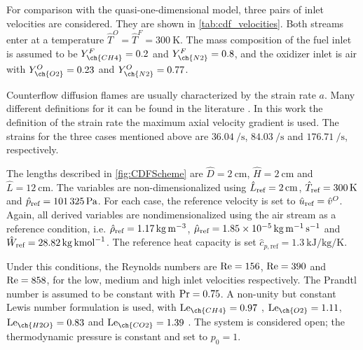 For comparison with the quasi-one-dimensional model, three pairs of inlet velocities are considered. They are shown in \cref{tab:cdf_velocities}. Both streams enter at a temperature $\hat T^O = \hat T^F = \SI{300}{\kelvin}$. The mass composition of the fuel inlet is assumed to be  $Y^F_{\ch{CH4}} = 0.2$ and $Y^F_{\ch{N2}} = 0.8$, and the oxidizer inlet is air with  $Y^O_{\ch{O2}} = 0.23$ and $Y^O_{\ch{N2}} = 0.77$. 


Counterflow diffusion flames are usually characterized by the strain rate $a$. Many different definitions for it can be found in the literature \parencite{fialaNonpremixedCounterflowFlames2014}. In this work the definition of the strain rate the maximum axial velocity gradient is used. The strains for the three cases mentioned above are $\SI{36.04}{\per\second}$, $\SI{84.03}{\per\second}$ and $\SI{176.71}{\per\second}$, respectively. 


The lengths described in \cref{fig:CDFScheme} are $\hat D = \SI{2}{\centi\meter}$, $\hat H = \SI{2}{\centi\meter}$ and $\hat L = \SI{12}{\centi\meter}$. The variables are non-dimensionalized using $\hat L_{\text{ref}} = \SI{2}{\centi\meter}$, $\hat T_{\text{ref}} = \SI{300}{\kelvin}$ and $\hat p_{\text{ref}} = \SI{101325}{\pascal}$.  For each case, the reference velocity is set to $\hat u_{\text{ref}} = \hat v^O$.  Again, all derived variables are nondimensionalized using the air stream as a reference condition, i.e. $\hat \rho_{\text{ref}} = \SI{1.17}{\kilo \gram \per \cubic \meter}$, $\hat \mu_{\text{ref}} = \SI{1.85e-5}{\kilo \gram \per \meter \per \second}$ and $\hat W_{\text{ref}} = \SI{28.82}{\kilo \gram \per \kilo\mole}$. The reference heat capacity is set $\hat{c}_{p,\text{ref}}= \SI{1.3}{\kilo \joule \per \kilo \gram \per \kelvin}$. 

Under this conditions, the Reynolds numbers are $\text{Re} = 156$, $\text{Re} = 390$ and $\text{Re} = 858$, for the low, medium and high inlet velocities respectively.  The Prandtl number is assumed to be constant with $\text{Pr} = 0.75$. A non-unity but constant Lewis number formulation is used, with $\Lewis_{\ch{CH4}} =  0.97 $ , $\Lewis_{\ch{O2}} = 1.11 $, $\Lewis_{\ch{H2O}} = 0.83 $ and $\Lewis_{\ch{CO2}} = 1.39 $ \parencite{smookePremixedNonpremixedTest1991}. The system is considered open; the thermodynamic pressure is constant and set to $ p_0 = 1$. %



